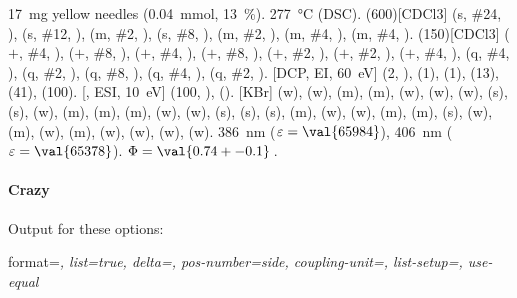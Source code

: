 \documentclass{chemmacros-manual}
\begin{document}
\begin{experimental}[format=\bfseries,delta=(ppm),list=true,use-equal]
   \SI{17}{\milli\gram} yellow needles (\SI{0.04}{\milli\mole},
  \SI{13}{\percent}).
   \SI{277}{\celsius} (DSC).
  \NMR(600)[CDCl3]  (s, \#{24}, ),  (s, \#{12},
  ),  (m, \#{2}, ),  (s, \#{8},
  ),  (m, \#{2}, ),  (m, \#{4},
  ),  (m, \#{4}, ).
  (150)[CDCl3]  ($+$, \#{4}, ),  ($+$,
  \#{8}, ),  ($+$, \#{4}, ),  ($+$, \#{8},
  ),  ($+$, \#{2}, ),  ($+$, \#{2},
  ),  ($+$, \#{4}, ),  (q, \#{4},
  ),  (q, \#{2}, ),  (q, \#{8}, ),
   (q, \#{4}, ),  (q, \#{2}, ).
  [DCP, EI, \SI{60}{\electronvolt}]  (2, ), 
  (1),  (1),  (13),  (41),  (100).
  [, ESI, \SI{10}{\electronvolt}]  (100,
  ),  ().
  [KBr]  (w),  (w),  (m), 
  (m),  (w),  (w),  (w),  (s),
   (s),  (w),  (m),  (m), 
  (m),  (w),  (w),  (s),  (s),
   (s),  (m),  (w),  (w), 
  (m),  (m),  (s),  (w),  (m), 
  (w),  (m),  (w),  (w),  (w), 
  (w).
   \SI{386}{\nano\metre} ($\varepsilon = \val{65984}$),
  \SI{406}{\nano\metre} ($\varepsilon = \val{65378}$).
   $\Phi = \val{0.74+-0.1}$\,.
\end{experimental}

\paragraph{Crazy}
Output for these options:

\begin{sourcecode}
  format=\color{red}\itshape,
  list=true,
  delta=\textcolor{green}{},
  pos-number=side,
  coupling-unit=\mega\gram\per\square\second,
  list-setup=,
  use-equal
\end{sourcecode}
\end{document}
